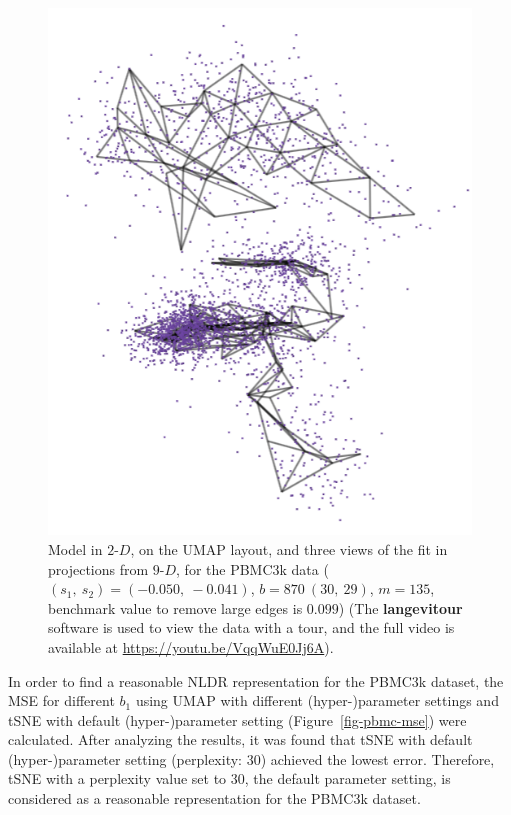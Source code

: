 \documentclass[
  12pt]{article}
\newcommand\gD{$2\text{-}D$}
\begin{document}
\begin{figure}[H]
%
\begin{minipage}{0.25\linewidth}
\includegraphics{figures/pbmc3k/sc_3.png}\end{minipage}%

\caption{\label{fig-pbmc1-sc}Model in \gD{}, on the UMAP layout, and
three views of the fit in projections from \(9\text{-}D\), for the
PBMC3k data (\((s_1, \ s_2) = (-0.050, \ -0.041)\),
\(b = 870 \  (30, \ 29)\), \(m = 135\), benchmark value to remove large
edges is \(0.099\)) (The \textbf{langevitour} software is used to view
the data with a tour, and the full video is available at
\url{https://youtu.be/VqqWuE0Jj6A}).}

\end{figure}%

In order to find a reasonable NLDR representation for the PBMC3k
dataset, the MSE for different \(b_1\) using UMAP with different
(hyper-)parameter settings and tSNE with default (hyper-)parameter
setting (Figure~\ref{fig-pbmc-mse}) were calculated. After analyzing the
results, it was found that tSNE with default (hyper-)parameter setting
(perplexity: \(30\)) achieved the lowest error. Therefore, tSNE with a
perplexity value set to \(30\), the default parameter setting, is
considered as a reasonable representation for the PBMC3k dataset.
\end{document}
